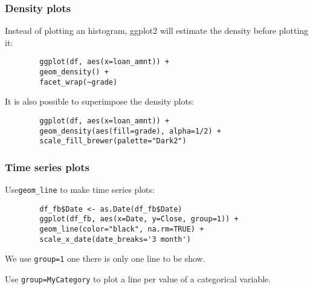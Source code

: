 \documentclass{beamer}
\begin{document}
	\begin{frame}[fragile]
		\frametitle{Density plots}

		Instead of plotting an histogram, ggplot2 will estimate the density before plotting it:

		\vspace{1em}

		\begin{exampleblock}{}
		\begin{BVerbatim}
		ggplot(df, aes(x=loan_amnt)) + 
		geom_density() + 
		facet_wrap(~grade)
		\end{BVerbatim}
		\end{exampleblock}{}

		\vspace{1em}

		It is also possible to superimpose the density plots:

		\vspace{1em}
	
		\begin{exampleblock}{}
		\begin{BVerbatim}
		ggplot(df, aes(x=loan_amnt)) + 
		geom_density(aes(fill=grade), alpha=1/2) +
		scale_fill_brewer(palette="Dark2")
		\end{BVerbatim}
		\end{exampleblock}{}

	\end{frame}

	\begin{frame}[fragile]
		\frametitle{Time series plots}

		Use\verb|geom_line| to make time series plots:

		\vspace{2em}

		\begin{exampleblock}{}
		\begin{BVerbatim}
		df_fb$Date <- as.Date(df_fb$Date)
		ggplot(df_fb, aes(x=Date, y=Close, group=1)) + 
		geom_line(color="black", na.rm=TRUE) +
		scale_x_date(date_breaks='3 month')
		\end{BVerbatim}
		\end{exampleblock}{}

		\vspace{2em}

		We use \verb|group=1| one there is only one line to be show.

		\vspace{2em}

		Use \verb|group=MyCategory| to plot a line per value of a categorical variable.

	\end{frame}
\end{document}
